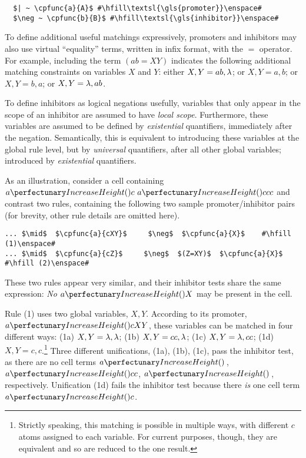 \lstset{xleftmargin=.5in, xrightmargin=.5in} 
\begin{lstlisting}
  $| ~ \cpfunc{a}{A}$ #\hfill\textsl{\gls{promoter}}\enspace#
  $\neg ~ \cpfunc{b}{B}$ #\hfill\textsl{\gls{inhibitor}}\enspace#
\end{lstlisting}

To define additional useful matchings expressively, 
\glspl{promoter} and \glspl{inhibitor} may also use virtual ``equality'' terms, 
written in infix format, with the \(=\) operator.
For example, including the term \((ab = XY)\) indicates the following additional matching constraints on variables \(X\) and \(Y\): either \(X, Y = ab, \lambda\); or \(X, Y = a, b\); or \(X, Y = b, a\); or \(X, Y = \lambda, ab\).

To define \glspl{inhibitor} as logical negations usefully,
variables that only appear in the scope of an \gls{inhibitor} are assumed to have \emph{local scope}. 
Furthermore, these variables are assumed to be defined by \emph{existential} quantifiers, immediately after the negation. 
Semantically, this is equivalent to introducing these variables at the global rule level, 
but by \emph{universal} quantifiers, after all other global variables;
introduced by \emph{existential} quantifiers.

As an illustration, consider a cell containing \(\cpfunc{a}{c} ~ \cpfunc{a}{ccc}\) and contrast two rules, 
containing the following two sample \gls{promoter}/\gls{inhibitor} pairs 
(for brevity, other rule details are omitted here).

\lstset{xleftmargin=.5in, xrightmargin=.5in} 
\begin{lstlisting}
... $\mid$  $\cpfunc{a}{cXY}$     $\neg$  $\cpfunc{a}{X}$    #\hfill (1)\enspace#
... $\mid$  $\cpfunc{a}{cZ}$     $\neg$  $(Z=XY)$  $\cpfunc{a}{X}$    #\hfill (2)\enspace#
\end{lstlisting}

These two rules appear very similar, and their \gls{inhibitor} tests share the same expression: 
\emph{No} \(\cpfunc{a}{X}\) may be present in the cell.

Rule (1) uses two global variables, \(X, Y\). 
According to its \gls{promoter}, \(\cpfunc{a}{cXY}\), these variables can be matched in four different ways:
(1a) \(X, Y = \lambda, \lambda\); (1b) \(X, Y = cc, \lambda\); (1c) \(X, Y = \lambda, cc\); (1d) \(X, Y = c, c\).\footnote{Strictly speaking, this matching is possible in multiple ways, with different \(c\) atoms assigned to each variable.  For current purposes, though, they are equivalent and so are reduced to the one result.}
Three different unifications, (1a), (1b), (1c), pass the \gls{inhibitor} test, 
as there are no cell terms \(\cpfunc{a}{\,}\), \(\cpfunc{a}{cc}\), \(\cpfunc{a}{\,}\), respectively. 
Unification (1d) fails the \gls{inhibitor} test because there \emph{is} one cell term \(\cpfunc{a}{c}\).


